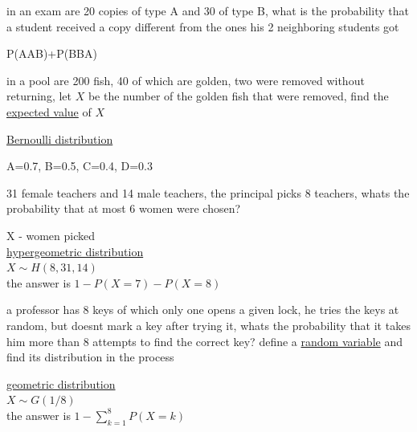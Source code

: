 \documentclass[a4paper,12pt]{article}
\begin{document}
\begin{question}
in an exam are 20 copies of type A and 30 of type B, what is the probability that a student received a copy different from the ones his 2 neighboring students got\\
\begin{answer}
P(AAB)+P(BBA)\\
\end{answer}
\end{question}
\begin{question}
in a pool are 200 fish, 40 of which are golden, two were removed without returning, let \(X\) be the number of the golden fish that were removed, find the \href{20230121184721-expected_value.org}{expected value} of \(X\)\\
\begin{answer}
\href{20230113174354-binomial_distribution.org}{Bernoulli distribution}\\
\end{answer}
\end{question}
\begin{question}
A=0.7, B=0.5, C=0.4, D=0.3\\
\end{question}
\begin{question}
31 female teachers and 14 male teachers, the principal picks 8 teachers, whats the probability that at most 6 women were chosen?\\
\begin{answer}
X - women picked\\
\href{20230113165622-hypergeometric_distribution.org}{hypergeometric distribution}\\
\(X \sim H(8,31,14)\)\\
the answer is \(1-P(X=7)-P(X=8)\)\\
\end{answer}
\end{question}
\begin{question}
a professor has 8 keys of which only one opens a given lock, he tries the keys at random, but doesnt mark a key after trying it, whats the probability that it takes him more than 8 attempts to find the correct key? define a \href{20230104221353-random_variable.org}{random variable} and find its distribution in the process\\
\begin{answer}
\href{20230113173836-geometric_distribution.org}{geometric distribution}\\
\(X \sim G(1/8)\)\\
the answer is \(1-\sum_{k=1}^{8} P(X=k)\)\\
\end{answer}
\end{question}
\end{document}
